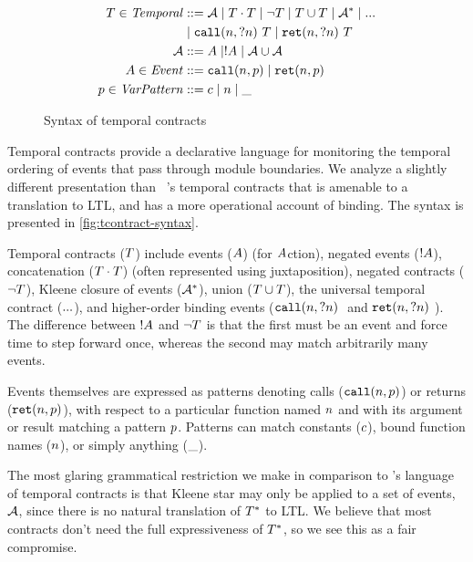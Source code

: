 \documentclass[preprint,onecolumn,9pt]{sigplanconf} %
\begin{document}
\begin{figure}
  \begin{align*}
 T \in \mathit{Temporal} &::=
      {\mathcal A}
 \mid T \cdot T
 \mid \neg T
 \mid T \cup T
 \mid {\mathcal A}^*
 \mid {\tt ...} \\
&\mid {\tt call}(n, {\tt ?}n)\ T
 \mid {\tt ret}(n, {\tt ?}n)\ T \\
{\mathcal A} &::= A \mid ! A \mid {\mathcal A} \cup {\mathcal A} \\
A \in \mathit{Event} &::= {\tt call}(n, p) \mid {\tt ret}(n, p) \\
p \in \mathit{VarPattern} &::= c \mid n \mid \_
  \end{align*}
  \caption{Syntax of temporal contracts}
  \label{fig:tcontract-syntax}
\end{figure}

Temporal contracts provide a declarative language for monitoring the temporal ordering of events that pass through module boundaries.
%
We analyze a slightly different presentation than ~\citep{ianjohnson:dfm:icfp2011}'s temporal contracts that is amenable to a translation to LTL, and has a more operational account of binding.
%
The syntax is presented in \autoref{fig:tcontract-syntax}.

Temporal contracts ($T$) include events ($A$) (for $A$ction), negated events ($! A$), concatenation ($T \cdot T$) (often represented using juxtaposition), negated contracts ($\neg T$), Kleene closure of events (${\mathcal A}^*$), union ($T \cup T$), the universal temporal contract (${\tt ...}$), and higher-order binding events ($\stcall{\mname}{\mname}$ and $\stret{\mname}{\mname}$).
%
The difference between $! A$ and $\neg T$ is that the first must be an event and force time to step forward once, whereas the second may match arbitrarily many events.

Events themselves are expressed as patterns denoting calls (${\tt call}(n, p)$) or returns (${\tt ret}(n, p)$), with respect to a particular function named $n$ and with its argument or result matching a pattern $p$.
%
Patterns can match constants ($c$), bound function names ($n$), or simply anything ($\_$).

The most glaring grammatical restriction we make in comparison to \citeauthor{ianjohnson:dfm:icfp2011}'s language of temporal contracts is that Kleene star may only be applied to a set of events, ${\mathcal A}$, since there is no natural translation of $T^*$ to LTL.
%
We believe that most contracts don't need the full expressiveness of $T^*$, so we see this as a fair compromise.
\end{document}
